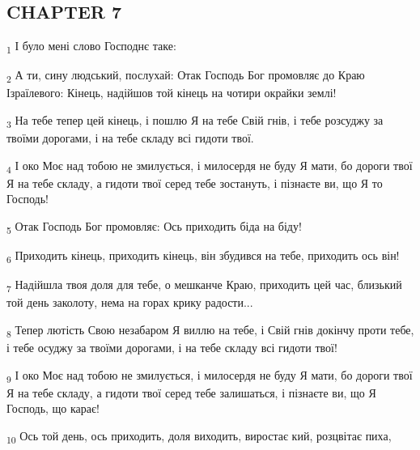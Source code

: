 \subsection{CHAPTER 7}
\begin{tcolorbox}
\textsubscript{1} І було мені слово Господнє таке:
\end{tcolorbox}
\begin{tcolorbox}
\textsubscript{2} А ти, сину людський, послухай: Отак Господь Бог промовляє до Краю Ізраїлевого: Кінець, надійшов той кінець на чотири окрайки землі!
\end{tcolorbox}
\begin{tcolorbox}
\textsubscript{3} На тебе тепер цей кінець, і пошлю Я на тебе Свій гнів, і тебе розсуджу за твоїми дорогами, і на тебе складу всі гидоти твої.
\end{tcolorbox}
\begin{tcolorbox}
\textsubscript{4} І око Моє над тобою не змилується, і милосердя не буду Я мати, бо дороги твої Я на тебе складу, а гидоти твої серед тебе зостануть, і пізнаєте ви, що Я то Господь!
\end{tcolorbox}
\begin{tcolorbox}
\textsubscript{5} Отак Господь Бог промовляє: Ось приходить біда на біду!
\end{tcolorbox}
\begin{tcolorbox}
\textsubscript{6} Приходить кінець, приходить кінець, він збудився на тебе, приходить ось він!
\end{tcolorbox}
\begin{tcolorbox}
\textsubscript{7} Надійшла твоя доля для тебе, о мешканче Краю, приходить цей час, близький той день заколоту, нема на горах крику радости...
\end{tcolorbox}
\begin{tcolorbox}
\textsubscript{8} Тепер лютість Свою незабаром Я виллю на тебе, і Свій гнів докінчу проти тебе, і тебе осуджу за твоїми дорогами, і на тебе складу всі гидоти твої!
\end{tcolorbox}
\begin{tcolorbox}
\textsubscript{9} І око Моє над тобою не змилується, і милосердя не буду Я мати, бо дороги твої Я на тебе складу, а гидоти твої серед тебе залишаться, і пізнаєте ви, що Я Господь, що карає!
\end{tcolorbox}
\begin{tcolorbox}
\textsubscript{10} Ось той день, ось приходить, доля виходить, виростає кий, розцвітає пиха,
\end{tcolorbox}
